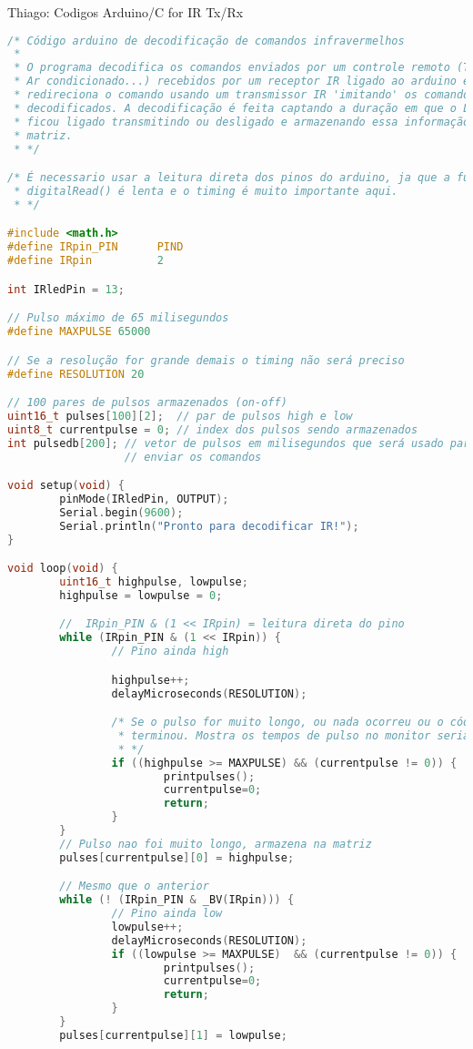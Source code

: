 \begin{section}{Thiago: Codigos Arduino/C for IR Tx/Rx}
\begin{lstlisting}[language=c, caption={fun\c{c}\~{a}o $grant\_db()$}, label={lst:dbphi8}]
/* Código arduino de decodificação de comandos infravermelhos
 *
 * O programa decodifica os comandos enviados por um controle remoto (TV, DVD,
 * Ar condicionado...) recebidos por um receptor IR ligado ao arduino e 
 * redireciona o comando usando um transmissor IR 'imitando' os comandos 
 * decodificados. A decodificação é feita captando a duração em que o LED IR
 * ficou ligado transmitindo ou desligado e armazenando essa informação em uma
 * matriz.
 * */

/* É necessario usar a leitura direta dos pinos do arduino, ja que a funcão
 * digitalRead() é lenta e o timing é muito importante aqui.
 * */

#include <math.h>
#define IRpin_PIN      PIND
#define IRpin          2

int IRledPin = 13;

// Pulso máximo de 65 milisegundos
#define MAXPULSE 65000

// Se a resolução for grande demais o timing não será preciso
#define RESOLUTION 20 

// 100 pares de pulsos armazenados (on-off)
uint16_t pulses[100][2];  // par de pulsos high e low 
uint8_t currentpulse = 0; // index dos pulsos sendo armazenados
int pulsedb[200]; // vetor de pulsos em milisegundos que será usado para 
				  // enviar os comandos

void setup(void) {
		pinMode(IRledPin, OUTPUT);
		Serial.begin(9600);
		Serial.println("Pronto para decodificar IR!");
}

void loop(void) {
		uint16_t highpulse, lowpulse;  
		highpulse = lowpulse = 0; 

		//  IRpin_PIN & (1 << IRpin) = leitura direta do pino 
		while (IRpin_PIN & (1 << IRpin)) {
				// Pino ainda high

				highpulse++;
				delayMicroseconds(RESOLUTION);

				/* Se o pulso for muito longo, ou nada ocorreu ou o código
				 * terminou. Mostra os tempos de pulso no monitor serial.
				 * */
				if ((highpulse >= MAXPULSE) && (currentpulse != 0)) {
						printpulses();
						currentpulse=0;
						return;
				}
		}
		// Pulso nao foi muito longo, armazena na matriz
		pulses[currentpulse][0] = highpulse;

		// Mesmo que o anterior
		while (! (IRpin_PIN & _BV(IRpin))) {
				// Pino ainda low
				lowpulse++;
				delayMicroseconds(RESOLUTION);
				if ((lowpulse >= MAXPULSE)  && (currentpulse != 0)) {
						printpulses();
						currentpulse=0;
						return;
				}
		}
		pulses[currentpulse][1] = lowpulse;


\end{lstlisting}
\end{section}
